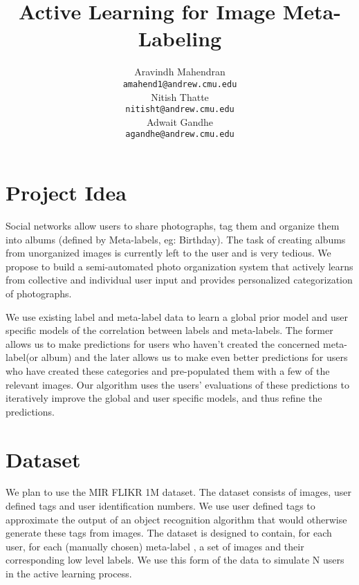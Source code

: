 \documentclass{article} %
\title{Active Learning for Image Meta-Labeling}
\author{
Aravindh Mahendran \\
\texttt{amahend1@andrew.cmu.edu} \\ 
\And
Nitish Thatte \\
\texttt{nitisht@andrew.cmu.edu} \\
\AND
Adwait Gandhe \\
\texttt{agandhe@andrew.cmu.edu} \\
}
\begin{document}
\vspace{-0.5in}
\maketitle
\vspace{-0.5in}
\section{Project Idea}
Social networks allow users to share photographs, tag them and organize them into albums (defined by Meta-labels, eg: Birthday). The task of creating albums from unorganized images is currently left to the user and is very tedious. We propose to build a semi-automated photo organization system that actively learns from collective and individual user input and provides personalized categorization of photographs. 

We use existing label and meta-label data to learn a global prior model and user specific models of the correlation between labels and meta-labels. The former allows us to make predictions for users who haven't created the concerned meta-label(or album) and the later allows us to make even better predictions for users who have created these categories and pre-populated them with a few of the relevant images. Our algorithm uses the users' evaluations of these predictions to iteratively improve the global and user specific models, and thus refine the predictions.

\section{Dataset}
We plan to use the MIR FLIKR 1M dataset. The dataset consists of images, user defined tags and user identification numbers. %
We use user defined tags to approximate the output of an object recognition algorithm that would otherwise generate these tags from images.
The dataset is designed to contain, for each user, for each (manually chosen) meta-label , a set of images and their corresponding low level labels. We use this form of the data to simulate N users in the active learning process. 
\end{document}
